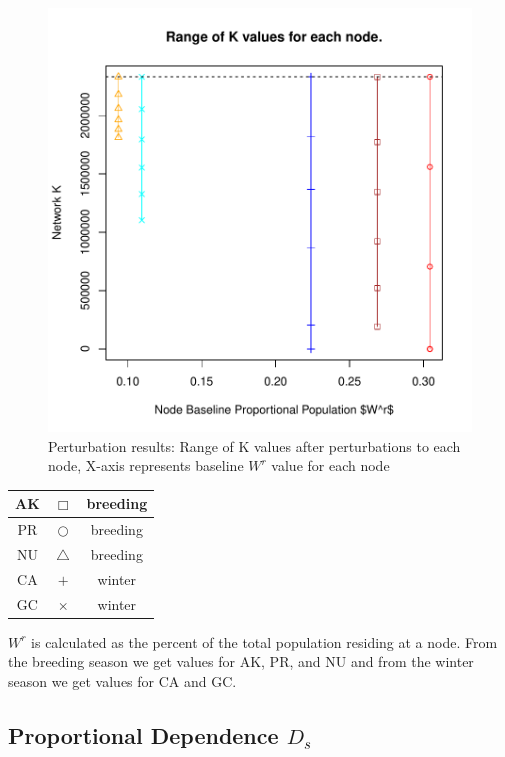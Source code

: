 \documentclass[10pt]{article}
\begin{document}
\vspace{-.5cm}
\begin{figure}[H]
\begin{center}
\includegraphics[width=.8\textwidth, height=.8\textwidth]{RGraphics-pintail_barcr_WR}
\caption{Perturbation results: Range of K values after perturbations to each node, X-axis represents baseline $W^r$ value for each node}\label{fig:pintail_barcr_WR}
\end{center}
\end{figure}

\vspace{-.5cm}
\begin{tabular}{|c|c|c|}
\hline
{\color{Sepia}AK} & $\Box$ & breeding \\
\hline
{\color{red}PR} & $\bigcirc$ & breeding \\
\hline
{\color{orange}NU} & $\triangle$ & breeding \\
\hline
{\color{blue}CA} & $+$ & winter \\
\hline
{\color{cyan}GC} & $\times$ & winter \\
\hline
\end{tabular}

\vspace{1cm}
$W^r$ is calculated as the percent of the total population residing at a node. From the breeding season we get values for AK, PR, and NU and from the winter season we get values for CA and GC.

\newpage
\subsection{Proportional Dependence \texorpdfstring{$D_s$}{DS}}
\end{document}
